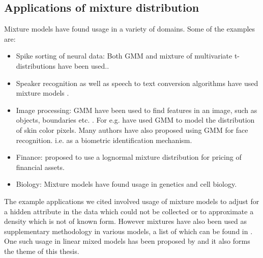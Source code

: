 \subsection{Applications of mixture distribution}
Mixture models have found usage in a variety of domains. Some of the examples are:
\begin{itemize}
\item Spike sorting of neural data: Both GMM and mixture of multivariate t-distributions have been used.\citep{lewicki_bayesian_1994,shoham_robust_2003}.
\item Speaker recognition as well as speech to text conversion algorithms have used mixture models \citep{simancas-acevedo_speaker_2001,xiang_efficient_2003,povey_subspace_2011}.
\item Image processing: GMM have been used to find features in an image, such as objects, boundaries etc. \citep{fu_color_2012}. For e.g. \citet{ming-hsuan_yang_gaussian_1998} have used GMM to model the distribution of skin color pixels. Many authors have also proposed using GMM for face recognition. i.e. as a biometric identification mechanism.
\item Finance: \citet{brigo_lognormal-mixture_2002} proposed to use a lognormal mixture distribution for pricing of financial assets.
\item Biology: Mixture models have found usage in genetics and cell biology.\citep{sim_evaluating_2012,gianola_mixture_2007} 
\end{itemize}

The example applications we cited involved usage of mixture models to adjust for a hidden attribute in the data which could not be collected or to approximate a density which is not of known form. However mixtures have also been used as supplementary methodology in various models, a list of which can be found in \citet[pg. 238]{fruhwirth-schnatter_finite_2013}. One such usage in linear mixed models has been proposed by \citet{verbeke_linear_1996} and it also forms the theme of this thesis.

